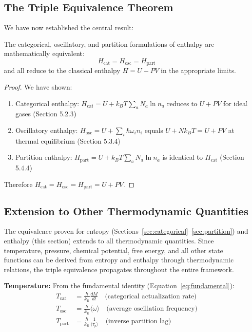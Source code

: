 \subsection{The Triple Equivalence Theorem}

We have now established the central result:

\begin{theorem}
\label{thm:enthalpy_equivalence}
The categorical, oscillatory, and partition formulations of enthalpy are mathematically equivalent:
\begin{equation}
H_{\text{cat}} = H_{\text{osc}} = H_{\text{part}}
\end{equation}
and all reduce to the classical enthalpy $H = U + PV$ in the appropriate limits.
\end{theorem}

\begin{proof}
We have shown:
\begin{enumerate}
\item Categorical enthalpy: $H_{\text{cat}} = U + k_B T \sum_a N_a \ln n_a$ reduces to $U + PV$ for ideal gases (Section 5.2.3)
\item Oscillatory enthalpy: $H_{\text{osc}} = U + \sum_i \hbar\omega_i n_i$ equals $U + Nk_BT = U + PV$ at thermal equilibrium (Section 5.3.4)
\item Partition enthalpy: $H_{\text{part}} = U + k_B T \sum_a N_a \ln n_a$ is identical to $H_{\text{cat}}$ (Section 5.4.4)
\end{enumerate}
Therefore $H_{\text{cat}} = H_{\text{osc}} = H_{\text{part}} = U + PV$.
\end{proof}



\subsection{Extension to Other Thermodynamic Quantities}

The equivalence proven for entropy (Sections~\ref{sec:categorical}--\ref{sec:partition}) and enthalpy (this section) extends to all thermodynamic quantities. Since temperature, pressure, chemical potential, free energy, and all other state functions can be derived from entropy and enthalpy through thermodynamic relations, the triple equivalence propagates throughout the entire framework.

\textbf{Temperature:} From the fundamental identity (Equation~\ref{eq:fundamental}):
\begin{align}
T_{\text{cat}} &= \frac{\hbar}{k_B} \frac{dM}{dt} \quad \text{(categorical actualization rate)} \\
T_{\text{osc}} &= \frac{\hbar}{k_B} \langle\omega\rangle \quad \text{(average oscillation frequency)} \\
T_{\text{part}} &= \frac{\hbar}{k_B} \frac{1}{\langle\tau_p\rangle} \quad \text{(inverse partition lag)}
\end{align}

